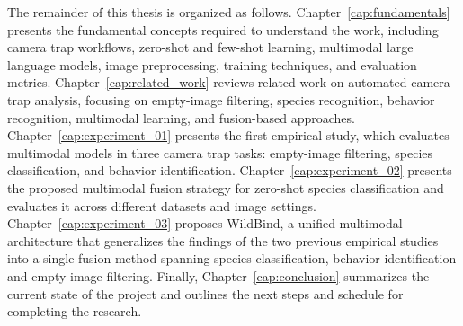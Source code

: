 The remainder of this thesis is organized as follows. Chapter~\ref{cap:fundamentals} presents the fundamental concepts required to understand the work, including camera trap workflows, zero-shot and few-shot learning, multimodal large language models, image preprocessing, training techniques, and evaluation metrics. Chapter~\ref{cap:related_work} reviews related work on automated camera trap analysis, focusing on empty-image filtering, species recognition, behavior recognition, multimodal learning, and fusion-based approaches. Chapter~\ref{cap:experiment_01} presents the first empirical study, which evaluates multimodal models in three camera trap tasks: empty-image filtering, species classification, and behavior identification. Chapter~\ref{cap:experiment_02} presents the proposed multimodal fusion strategy for zero-shot species classification and evaluates it across different datasets and image settings. Chapter~\ref{cap:experiment_03} proposes WildBind, a unified multimodal architecture that generalizes the findings of the two previous empirical studies into a single fusion method spanning species classification, behavior identification and empty-image filtering. Finally, Chapter~\ref{cap:conclusion} summarizes the current state of the project and outlines the next steps and schedule for completing the research.